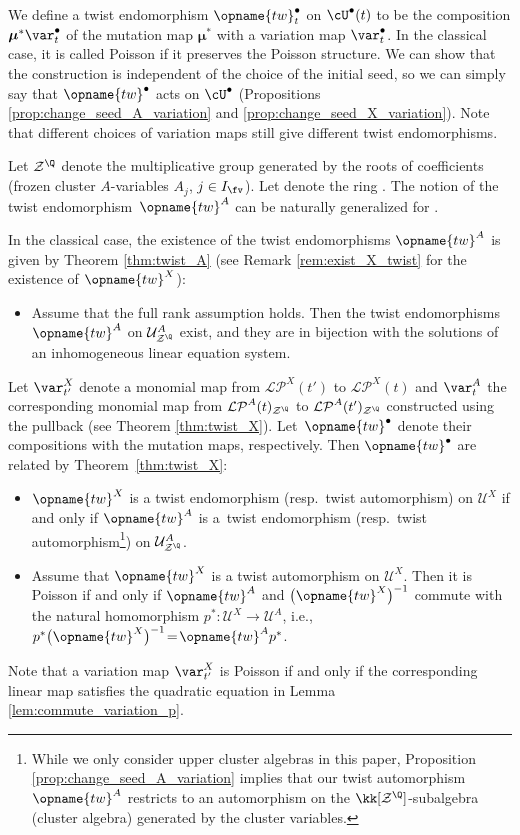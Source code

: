 \documentclass[pdftex]{sigma}
\renewcommand{\tw}{\opname{tw}}
\newcommand{\Ifv}{I_{\fv}}
\newcommand{\upClAlg}{\mathcal{U}^A}
\newcommand{\XClAlg}{\mathcal{U}^X}
\newcommand{\LP}{{\mathcal{LP}}}
\newcommand{\fFac}{\mathcal{Z}}
\newcommand{\fFacRoot}{\fFac^{\Q}}
\newcommand{\seq}{\boldsymbol{\mu}}%
\renewcommand{\tw}{\opname{tw}}
\numberwithin{equation}{section}
\begin{document}
We define a twist endomorphism $\tw_{t}^{\bullet}$ on $\cU^{\bullet}(t)$
to be the composition $\seq^{*}\var_{t}^{\bullet}$ of the mutation
map $\seq^{*}$ with a variation map $\var_{t}^{\bullet}$. In the classical case, it is
called Poisson if it preserves the Poisson structure.
We can show that the construction is independent of the choice of
the initial seed, so we can simply say that $\tw^{\bullet}$ acts
on $\cU^{\bullet}$ (Propositions \ref{prop:change_seed_A_variation} and \ref{prop:change_seed_X_variation}). Note that different choices of variation maps still give different twist endomorphisms.

Let $\fFacRoot$ denote the multiplicative group generated by the
roots of coefficients (frozen cluster $A$-variables $A_{j}$, $j\in\Ifv$).
Let \smash{$\upClAlg_{\fFacRoot}$} denote the ring \smash{$\upClAlg\otimes \kk\big[\fFacRoot\big]$}.
The notion of the twist endomorphism~$\tw^{A}$ can be naturally generalized
for \smash{$\upClAlg_{\fFacRoot}$}.

In the classical case, the existence of the twist endomorphisms $\tw^{A}$ is given by Theorem
\ref{thm:twist_A} \big(see Remark \ref{rem:exist_X_twist} for the existence
of $\tw^{X}$\big):
\begin{itemize}\itemsep=0pt
\item Assume that the full rank assumption holds. Then the twist endomorphisms
$\tw^{A}$ on $\upClAlg_{\fFacRoot}$ exist, and they are in bijection
with the solutions of an inhomogeneous linear equation system.
\end{itemize}
Let $\var_{t'}^{X}$ denote a monomial map from $\LP^{X}(t')$ to
$\LP^{X}(t)$ and $\var_{t}^{A}$ the corresponding monomial map from
$\LP^{A}(t)_{\fFacRoot}$ to $\LP^{A}(t')_{\fFacRoot}$ constructed
using the pullback (see Theorem \ref{thm:twist_X}). Let~$\tw^{\bullet}$
denote their compositions with the mutation maps, respectively. Then
$\tw^{\bullet}$ are related by Theorem~\ref{thm:twist_X}:
\begin{itemize}\itemsep=0pt
\item $\tw^{X}$ is a twist endomorphism (resp.\ twist automorphism) on $\XClAlg$
if and only if $\tw^{A}$ is a~twist endomorphism (resp.\ twist automorphism\footnote{While we only consider upper cluster algebras in this paper, Proposition \ref{prop:change_seed_A_variation} implies that our twist automorphism $\tw^{A}$ restricts to an automorphism on the $\kk[\fFacRoot]$-subalgebra (cluster algebra) generated by the cluster variables.})
on $\upClAlg_{\fFacRoot}$.
\item Assume that $\tw^{X}$ is a twist automorphism on $\XClAlg$.
Then it is Poisson if and only if $\tw^{A}$ and $\bigl(\tw^{X}\bigr)^{-1}$
commute with the natural homomorphism $p^{*}\colon\XClAlg\!\!\rightarrow\upClAlg$,
i.e., ${p^{*}\bigl(\tw^{X}\bigr)^{-1}\!=\!\tw^{A}p^{*}}$.
\end{itemize}
Note that a variation map $\var_{t'}^{X}$ is Poisson if and only if the corresponding linear map satisfies the quadratic equation in Lemma \ref{lem:commute_variation_p}.
\end{document}
